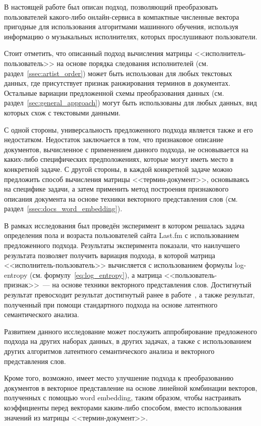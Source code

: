 \startconclusionpage
В настоящей работе был описан подход, позволяющий преобразовать
пользователей какого-либо онлайн-сервиса в компактные
численные вектора пригодные для использования алгоритмами машинного обучения,
используя информацию о музыкальных исполнителях, которых прослушивают
пользователи.

Стоит отметить, что описанный подход вычисления матрицы
<<исполнитель-пользователь>> на основе порядка следования исполнителей (см. 
раздел~\ref{ssec:artist_order}) может быть использован для
любых текстовых данных, где присутствует признак ранжирования
терминов в документах. Остальные вариации предложенной схемы
преобразования данных (см. раздел~\ref{sec:general_approach})
могут быть использованы для любых данных, вид которых схож с
текстовыми данными.

С одной стороны, универсальность предложенного подхода является также
и его недостатком. Недостаток заключается в том, что признаковое
описание документов, вычисленное с применением данного подхода,
не основывается на каких-либо специфических предположениях, которые
могут иметь место в конкретной задаче. С другой стороны, в каждой
конкретной задаче можно предложить способ вычисления матрицы
<<термин-документ>>, основываясь на специфике задачи, а затем
применить метод построения признакового описания документа на
основе техники векторного представления слов (см. 
раздел~\ref{ssec:docs_word_embedding}).

В рамках исследования был проведён эксперимент в котором решалась
задача определения пола и возраста пользователей сайта Last.fm с
использованием предложенного подхода. Результаты эксперимента
показали, что наилучшего результата позволяет получить вариация
подхода, в которой матрица <<исполнитель-пользователь>> вычисляется
с использованием формулы log-entropy (см. формулу~\ref{eq:log_entropy}),
а матрица <<пользователь-признак>>~--- на основе техники векторного
представления слов. Достигнутый результат превосходит результат
достигнутый ранее в работе~\cite{wu2014gender}, а также результат,
полученный при помощи стандартного подхода на основе латентного
семантического анализа.

Развитием данного исследование может послужить аппробирование 
предложеного подхода на других наборах данных, в других задачах,
а также с использованием других алгоритмов латентного семантического
анализа и векторного представления слов.

Кроме того, возможно, имеет место улучшение подхода к преобразованию
документов в векторное представление на основе линейной комбинации
векторов, полученных с помощью word embedding, таким образом, чтобы
настраивать коэффициенты перед векторами каким-либо способом, вместо
использования значений из матрицы <<термин-документ>>.

